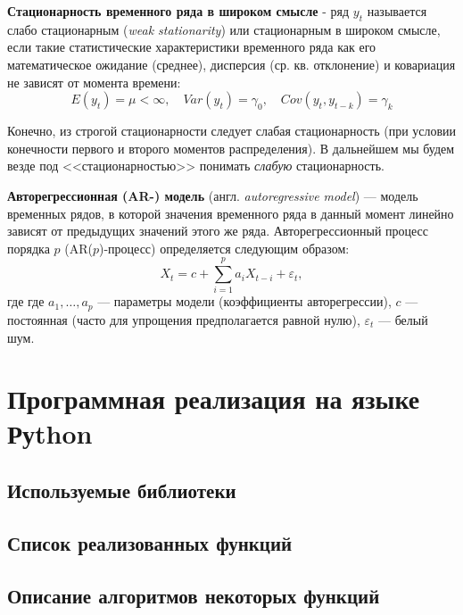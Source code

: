 \documentclass{article}
\begin{document}
  \textbf{Стационарность временного ряда в широком смысле} - ряд $y_t$ называется слабо стационарным (\textsl{weak stationarity}) или стационарным в широком смысле, если такие статистические характеристики временного ряда как его математическое ожидание (среднее), дисперсия (ср. кв. отклонение) и ковариация не зависят от момента времени:
  \begin{equation}
    {E(y_t) = \mu < \infty, \quad Var(y_t) = \gamma_0, \quad Cov(y_t, y_{t-k}) = \gamma_k}
  \end{equation}\par
  
  Конечно, из строгой стационарности следует слабая стационарность (при условии конечности первого и второго моментов распределения). В дальнейшем мы будем везде под <<стационарностью>> понимать \textsl{слабую} стационарность.\par 
  
  \textbf{Авторегрессионная (AR-) модель} (англ. \textsl{autoregressive model}) — модель временных рядов, в которой значения временного ряда в данный момент линейно зависят от предыдущих значений этого же ряда. Авторегрессионный процесс порядка $p$ (AR($p$)-процесс) определяется следующим образом:
  \begin{equation}
      X_t = c + \sum\limits_{i=1}^{p} a_i X_{t-i} + \varepsilon_t ,
  \end{equation}
  где где $a_1,\ldots ,a_p$ — параметры модели (коэффициенты авторегрессии), $c$ — постоянная (часто для упрощения предполагается равной нулю), $\varepsilon_t$ — белый шум.\par

\newpage

\section{Программная реализация на языке Руthon}
  
  \subsection{Используемые библиотеки}
  
  \subsection{Список реализованных функций}
  
  \subsection{Описание алгоритмов некоторых функций}
  
\end{document}
